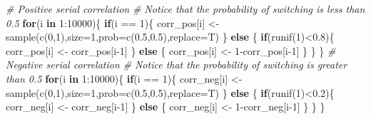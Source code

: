 \documentclass[
  11pt,
]{book}
\newenvironment{Shaded}{\begin{snugshade}}{\end{snugshade}}
\newcommand{\AttributeTok}[1]{\textcolor[rgb]{0.77,0.63,0.00}{#1}}
\newcommand{\CommentTok}[1]{\textcolor[rgb]{0.56,0.35,0.01}{\textit{#1}}}
\newcommand{\ControlFlowTok}[1]{\textcolor[rgb]{0.13,0.29,0.53}{\textbf{#1}}}
\newcommand{\DecValTok}[1]{\textcolor[rgb]{0.00,0.00,0.81}{#1}}
\newcommand{\FloatTok}[1]{\textcolor[rgb]{0.00,0.00,0.81}{#1}}
\newcommand{\FunctionTok}[1]{\textcolor[rgb]{0.00,0.00,0.00}{#1}}
\newcommand{\NormalTok}[1]{#1}
\newcommand{\OtherTok}[1]{\textcolor[rgb]{0.56,0.35,0.01}{#1}}
\newcommand{\SpecialCharTok}[1]{\textcolor[rgb]{0.00,0.00,0.00}{#1}}
\theoremstyle{definition}
\theoremstyle{definition}
\theoremstyle{definition}
\theoremstyle{definition}
\theoremstyle{remark}
\begin{document}
\begin{Shaded}
\begin{Highlighting}[]
\CommentTok{\# Positive serial correlation}
\CommentTok{\# Notice that the probability of switching is less than 0.5}
\ControlFlowTok{for}\NormalTok{(i }\ControlFlowTok{in} \DecValTok{1}\SpecialCharTok{:}\DecValTok{10000}\NormalTok{)\{}
  \ControlFlowTok{if}\NormalTok{(i }\SpecialCharTok{==} \DecValTok{1}\NormalTok{)\{}
\NormalTok{    corr\_pos[i] }\OtherTok{\textless{}{-}} \FunctionTok{sample}\NormalTok{(}\FunctionTok{c}\NormalTok{(}\DecValTok{0}\NormalTok{,}\DecValTok{1}\NormalTok{),}\AttributeTok{size=}\DecValTok{1}\NormalTok{,}\AttributeTok{prob=}\FunctionTok{c}\NormalTok{(}\FloatTok{0.5}\NormalTok{,}\FloatTok{0.5}\NormalTok{),}\AttributeTok{replace=}\NormalTok{T)}
\NormalTok{  \} }\ControlFlowTok{else}\NormalTok{ \{}
    \ControlFlowTok{if}\NormalTok{(}\FunctionTok{runif}\NormalTok{(}\DecValTok{1}\NormalTok{)}\SpecialCharTok{\textless{}}\FloatTok{0.8}\NormalTok{)\{}
\NormalTok{      corr\_pos[i] }\OtherTok{\textless{}{-}}\NormalTok{ corr\_pos[i}\DecValTok{{-}1}\NormalTok{]}
\NormalTok{    \} }\ControlFlowTok{else}\NormalTok{ \{}
\NormalTok{      corr\_pos[i] }\OtherTok{\textless{}{-}} \DecValTok{1}\SpecialCharTok{{-}}\NormalTok{corr\_pos[i}\DecValTok{{-}1}\NormalTok{]}
\NormalTok{    \}}
\NormalTok{  \}}
\NormalTok{\}}
\CommentTok{\# Negative serial correlation}
\CommentTok{\# Notice that the probability of switching is greater than 0.5}
\ControlFlowTok{for}\NormalTok{(i }\ControlFlowTok{in} \DecValTok{1}\SpecialCharTok{:}\DecValTok{10000}\NormalTok{)\{}
  \ControlFlowTok{if}\NormalTok{(i }\SpecialCharTok{==} \DecValTok{1}\NormalTok{)\{}
\NormalTok{    corr\_neg[i] }\OtherTok{\textless{}{-}} \FunctionTok{sample}\NormalTok{(}\FunctionTok{c}\NormalTok{(}\DecValTok{0}\NormalTok{,}\DecValTok{1}\NormalTok{),}\AttributeTok{size=}\DecValTok{1}\NormalTok{,}\AttributeTok{prob=}\FunctionTok{c}\NormalTok{(}\FloatTok{0.5}\NormalTok{,}\FloatTok{0.5}\NormalTok{),}\AttributeTok{replace=}\NormalTok{T)}
\NormalTok{  \} }\ControlFlowTok{else}\NormalTok{ \{}
    \ControlFlowTok{if}\NormalTok{(}\FunctionTok{runif}\NormalTok{(}\DecValTok{1}\NormalTok{)}\SpecialCharTok{\textless{}}\FloatTok{0.2}\NormalTok{)\{}
\NormalTok{      corr\_neg[i] }\OtherTok{\textless{}{-}}\NormalTok{ corr\_neg[i}\DecValTok{{-}1}\NormalTok{]}
\NormalTok{    \} }\ControlFlowTok{else}\NormalTok{ \{}
\NormalTok{      corr\_neg[i] }\OtherTok{\textless{}{-}} \DecValTok{1}\SpecialCharTok{{-}}\NormalTok{corr\_neg[i}\DecValTok{{-}1}\NormalTok{]}
\NormalTok{    \}}
\NormalTok{  \}}
\NormalTok{\}}
\end{Highlighting}
\end{Shaded}
\end{document}
